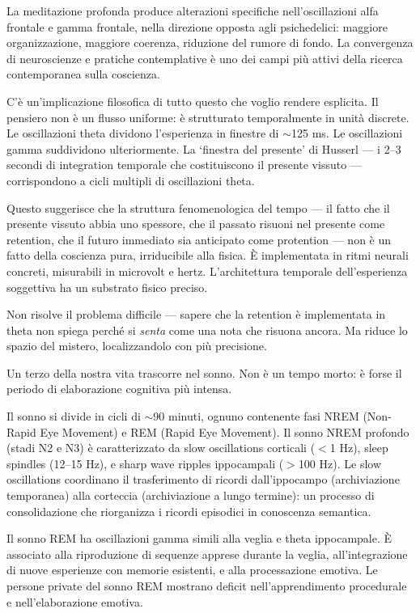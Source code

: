 \documentclass[12pt,a4paper,openany]{book}
\newcommand{\sezione}[1]{\vspace{1.2em}{\large\bfseries #1}\vspace{0.5em}\par}
\begin{document}
La meditazione profonda produce alterazioni specifiche nell'oscillazioni alfa frontale e gamma frontale, nella direzione opposta agli psichedelici: maggiore organizzazione, maggiore coerenza, riduzione del rumore di fondo. La convergenza di neuroscienze e pratiche contemplative è uno dei campi più attivi della ricerca contemporanea sulla coscienza.

\sezione{Il ritmo come struttura della mente}

C'è un'implicazione filosofica di tutto questo che voglio rendere esplicita. Il pensiero non è un flusso uniforme: è strutturato temporalmente in unità discrete. Le oscillazioni theta dividono l'esperienza in finestre di $\sim$125 ms. Le oscillazioni gamma suddividono ulteriormente. La `finestra del presente' di Husserl — i 2--3 secondi di integration temporale che costituiscono il presente vissuto — corrispondono a cicli multipli di oscillazioni theta.

Questo suggerisce che la struttura fenomenologica del tempo — il fatto che il presente vissuto abbia uno spessore, che il passato risuoni nel presente come retention, che il futuro immediato sia anticipato come protention — non è un fatto della coscienza pura, irriducibile alla fisica. È implementata in ritmi neurali concreti, misurabili in microvolt e hertz. L'architettura temporale dell'esperienza soggettiva ha un substrato fisico preciso.

Non risolve il problema difficile — sapere che la retention è implementata in theta non spiega perché si \textit{senta} come una nota che risuona ancora. Ma riduce lo spazio del mistero, localizzandolo con più precisione.

\sezione{Sonno e consolidamento: la notturna elaborazione}

Un terzo della nostra vita trascorre nel sonno. Non è un tempo morto: è forse il periodo di elaborazione cognitiva più intensa.

Il sonno si divide in cicli di $\sim$90 minuti, ognuno contenente fasi NREM (Non-Rapid Eye Movement) e REM (Rapid Eye Movement). Il sonno NREM profondo (stadi N2 e N3) è caratterizzato da slow oscillations corticali ($<$1 Hz), sleep spindles (12--15 Hz), e sharp wave ripples ippocampali ($>$100 Hz). Le slow oscillations coordinano il trasferimento di ricordi dall'ippocampo (archiviazione temporanea) alla corteccia (archiviazione a lungo termine): un processo di consolidazione che riorganizza i ricordi episodici in conoscenza semantica.

Il sonno REM ha oscillazioni gamma simili alla veglia e theta ippocampale. È associato alla riproduzione di sequenze apprese durante la veglia, all'integrazione di nuove esperienze con memorie esistenti, e alla processazione emotiva. Le persone private del sonno REM mostrano deficit nell'apprendimento procedurale e nell'elaborazione emotiva.
\end{document}
